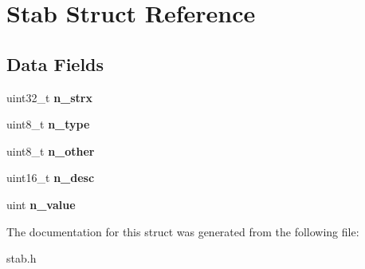 \hypertarget{structStab}{}\section{Stab Struct Reference}
\label{structStab}
\subsection*{Data Fields}
\begin{DoxyCompactItemize}
\item 
\mbox{\label{structStab_a8d874c575cc5137432a0b5fd0b202119}} 
uint32\+\_\+t {\bfseries n\+\_\+strx}
\item 
\mbox{\label{structStab_a4952b6befb5edaaa136fd49b7a52ddc8}} 
uint8\+\_\+t {\bfseries n\+\_\+type}
\item 
\mbox{\label{structStab_a70852cf6c049c690f0b7a93aab5fffbf}} 
uint8\+\_\+t {\bfseries n\+\_\+other}
\item 
\mbox{\label{structStab_a19fc71754b1c75e5dcd59f1522301f2d}} 
uint16\+\_\+t {\bfseries n\+\_\+desc}
\item 
\mbox{\label{structStab_a934b1b9ccdfb7c332b0513f9d460bed5}} 
uint {\bfseries n\+\_\+value}
\end{DoxyCompactItemize}


The documentation for this struct was generated from the following file\+:\begin{DoxyCompactItemize}
\item 
stab.\+h\end{DoxyCompactItemize}
